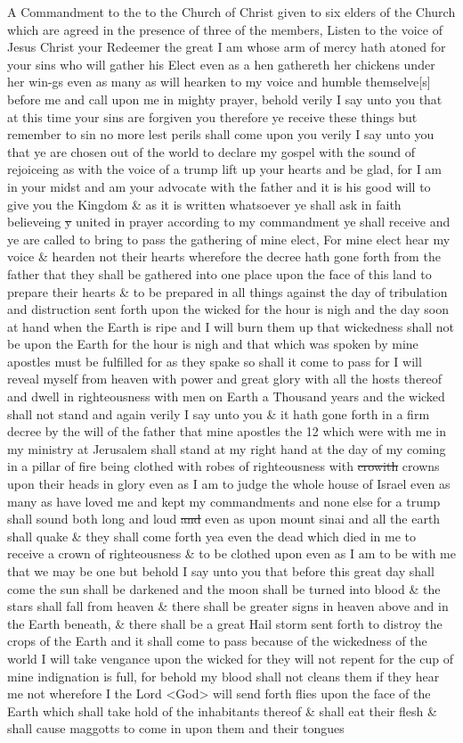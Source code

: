 		A Commandment to the to the Church of Christ given to six elders of the Church which are agreed in the presence of three of the members, Listen to the voice of Jesus Christ your Redeemer the great I am whose arm of mercy hath atoned for your sins who will gather his Elect even as a hen gathereth her chickens under her win-gs even as many as will hearken to my voice and humble themselve[s] before me and call upon me in mighty prayer, behold verily I say unto you that at this time your sins are forgiven you therefore ye receive these things but remember to sin no more lest perils shall come upon you verily I say unto you that ye are chosen out of the world to declare my gospel with the sound of rejoiceing as with the voice of a trump lift up your hearts and be glad, for I am in your midst and am your advocate with the father and it is his good will to give you the Kingdom \& as it is written whatsoever ye shall ask in faith believeing \sout{y} united in prayer according to my commandment ye shall receive and ye are called to bring to pass the gathering of mine elect, For mine elect hear my voice \& hearden not their hearts wherefore the decree hath gone forth from the father that they shall be gathered into one place upon the face of this land to prepare their hearts \& to be prepared in all things against the day of tribulation and distruction sent forth upon the wicked for the hour is nigh and the day soon at hand when the Earth is ripe and I will burn them up that wickedness shall not be upon the Earth for the hour is nigh and that which was spoken by mine apostles must be fulfilled for as they spake so shall it come to pass for I will reveal myself from heaven with power and great glory with all the hosts thereof and dwell in righteousness with men on Earth a Thousand years and the wicked shall not stand and again verily I say unto you \& it hath gone forth in a firm decree by the will of the father that mine apostles the 12 which were with me in my ministry at Jerusalem shall stand at my right hand at the day of my coming in a pillar of fire being clothed with robes of righteousness with \sout{crowith} crowns upon their heads in glory even as I am to judge the whole house of Israel even as many as have loved me and kept my commandments and none else for a trump shall sound both long and loud \sout{and} even as upon mount sinai and all the earth shall quake \& they shall come forth yea even the dead which died in me to receive a crown of righteousness \& to be clothed upon even as I am to be with me that we may be one but behold I say unto you that before this great day shall come the sun shall be darkened and the moon shall be turned into blood \& the stars shall fall from heaven \& there shall be greater signs in heaven above and in the Earth beneath, \& there shall be a great Hail storm sent forth to distroy the crops of the Earth and it shall come to pass because of the wickedness of the world I will take vengance upon the wicked for they will not repent for the cup of mine indignation is full, for behold my blood shall not cleans them if they hear me not wherefore I the Lord <God> will send forth flies upon the face of the Earth which shall take hold of the inhabitants thereof \& shall eat their flesh \& shall cause maggotts to come in upon them and their tongues 